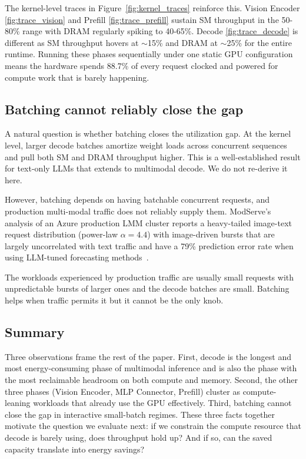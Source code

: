 \documentclass[10pt,twocolumn]{article}
\begin{document}
The kernel-level traces in Figure~\ref{fig:kernel_traces} reinforce this. Vision Encoder \ref{fig:trace_vision} and Prefill \ref{fig:trace_prefill} sustain SM throughput in the 50-80\% range with DRAM regularly spiking to 40-65\%. Decode \ref{fig:trace_decode} is different as SM throughput hovers at $\sim$15\% and DRAM at $\sim$25\% for the entire runtime. Running these phases sequentially under one static GPU configuration means the hardware spends 88.7\% of every request clocked and powered for compute work that is barely happening.

\subsection{Batching cannot reliably close the gap}

A natural question is whether batching closes the utilization gap. At the kernel level, larger decode batches amortize weight loads across concurrent sequences and pull both SM and DRAM throughput higher. This is a well-established result for text-only LLMs that extends to multimodal decode. We do not re-derive it here.

However, batching depends on having batchable concurrent requests, and production multi-modal traffic does not reliably supply them. ModServe's analysis of an Azure production LMM cluster reports a heavy-tailed image-text request distribution (power-law $\alpha=4.4$) with image-driven bursts that are largely uncorrelated with text traffic and have a 79\% prediction error rate when using LLM-tuned forecasting methods~\cite{modserve2025}.

The workloads experienced by production traffic are usually small requests with unpredictable bursts of larger ones and the decode batches are small. Batching helps when traffic permits it but it cannot be the only knob.

\subsection{Summary}

Three observations frame the rest of the paper. First, decode is the longest and most energy-consuming phase of multimodal inference and is also the phase with the most reclaimable headroom on both compute and memory. Second, the other three phases (Vision Encoder, MLP Connector, Prefill) cluster as compute-leaning workloads that already use the GPU effectively. Third, batching cannot close the gap in interactive small-batch regimes. These three facts together motivate the question we evaluate next: if we constrain the compute resource that decode is barely using, does throughput hold up? And if so, can the saved capacity translate into energy savings?
\end{document}
